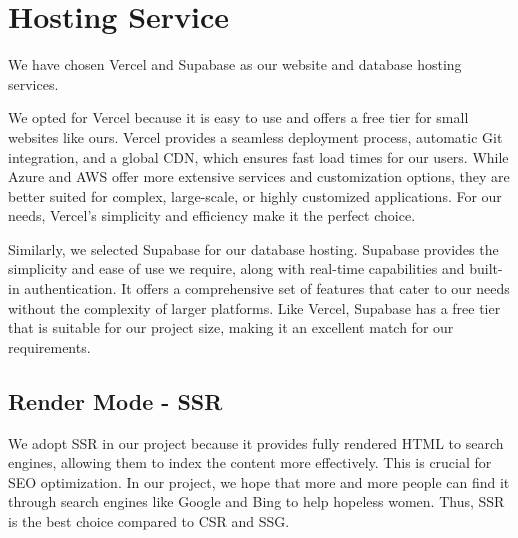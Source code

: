 \section{Hosting Service}

We have chosen Vercel and Supabase as our website and database hosting services.

We opted for Vercel because it is easy to use and offers a free tier for small websites like ours. Vercel provides a seamless deployment process, automatic Git integration, and a global CDN, which ensures fast load times for our users. While Azure and AWS offer more extensive services and customization options, they are better suited for complex, large-scale, or highly customized applications. For our needs, Vercel's simplicity and efficiency make it the perfect choice.

Similarly, we selected Supabase for our database hosting. Supabase provides the simplicity and ease of use we require, along with real-time capabilities and built-in authentication. It offers a comprehensive set of features that cater to our needs without the complexity of larger platforms. Like Vercel, Supabase has a free tier that is suitable for our project size, making it an excellent match for our requirements.

\subsection{Render Mode - SSR }
We adopt SSR in our project because it provides fully rendered HTML to search engines, allowing them to index the content more effectively. This is crucial for SEO optimization. In our project, we hope that more and more people can find it through search engines like Google and Bing to help hopeless women. Thus, SSR is the best choice compared to CSR and SSG.